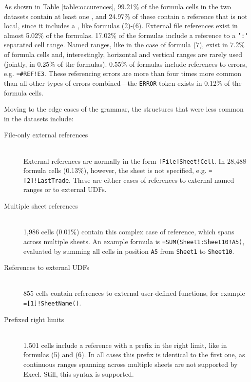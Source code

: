 \documentclass[conference]{IEEEtran}
\begin{document}
As shown in Table \ref{table:occurences}, 99.21\% of the formula cells in the two datasets contain at least one , and 24.97\% of these contain a reference that is not local, since it includes a , like formulas (2)-(6). External file references exist in almost 5.02\% of the formulas. 17.02\% of the formulas include a reference to a \texttt{':'} separated cell range. Named ranges, like in the case of formula (7), exist in 7.2\% of formula cells and, interestingly, horizontal and vertical ranges are rarely used (jointly, in 0.25\% of the formulas). 0.55\% of formulas include references to errors, e.g. \texttt{=\#REF!E3}. These referencing errors are more than four times more common than all other types of errors combined---the \texttt{ERROR} token exists in 0.12\% of the formula cells.

Moving to the edge cases of the grammar, the structures that were less common in the datasets include:
\begin{description}
	\item[File-only external references] \hfill \\
	External references are normally in the form \texttt{[File]Sheet!Cell}. In 28,488 formula cells (0.13\%), however, the sheet is not specified, e.g. \texttt{=[2]!LastTrade}. These are either cases of references to external named ranges or to external UDFs.
	\item[Multiple sheet references] \hfill \\
	1,986 cells (0.01\%) contain this complex case of reference, which spans across multiple sheets. An example formula is \texttt{=SUM(Sheet1:Sheet10!A5)}, evaluated by summing all cells in position \texttt{A5} from \texttt{Sheet1} to \texttt{Sheet10}.
	\item[References to external UDFs] \hfill \\
	855 cells contain references to external user-defined functions, for example \texttt{=[1]!SheetName()}.
	\item[Prefixed right limits] \hfill \\
	1,501 cells include a reference with a prefix in the right limit, like in formulas (5) and (6). In all cases this prefix is identical to the first one, as continuous ranges spanning across multiple sheets are not supported by Excel. Still, this syntax is supported.
\end{description}
\end{document}
